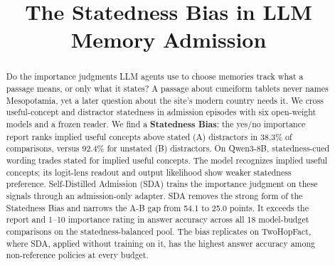 \documentclass[11pt]{article}
\title{The Statedness Bias in LLM Memory Admission}
\author{}
\renewcommand{\floatpagefraction}{0.8}
\renewcommand{\dbltopfraction}{0.85}
\renewcommand{\dblfloatpagefraction}{0.8}
\begin{document}
\maketitle

\begin{abstract}
Do the importance judgments LLM agents use to choose memories track what a passage means, or only what it states? A passage about cuneiform tablets never names Mesopotamia, yet a later question about the site's modern country needs it. We cross useful-concept and distractor statedness in admission episodes with six open-weight models and a frozen reader. We find a \textbf{Statedness Bias}: the yes/no importance report ranks implied useful concepts above stated (A) distractors in 38.3\% of comparisons, versus 92.4\% for unstated (B) distractors. On Qwen3-8B, statedness-cued wording trades stated for implied useful concepts. The model recognizes implied useful concepts; its logit-lens readout and output likelihood show weaker statedness preference. Self-Distilled Admission (SDA) trains the importance judgment on these signals through an admission-only adapter. SDA removes the strong form of the Statedness Bias and narrows the A-B gap from 54.1 to 25.0 points. It exceeds the report and 1--10 importance rating in answer accuracy across all 18 model-budget comparisons on the statedness-balanced pool. The bias replicates on TwoHopFact, where SDA, applied without training on it, has the highest answer accuracy among non-reference policies at every budget.
\end{abstract}








\FloatBarrier


\clearpage
\appendix
\setcounter{topnumber}{4}\setcounter{bottomnumber}{4}\setcounter{totalnumber}{8}\setcounter{dbltopnumber}{4}
\renewcommand{\topfraction}{0.95}\renewcommand{\bottomfraction}{0.95}\renewcommand{\textfraction}{0.05}
\renewcommand{\dbltopfraction}{0.95}\renewcommand{\floatpagefraction}{0.9}\renewcommand{\dblfloatpagefraction}{0.9}

\end{document}
